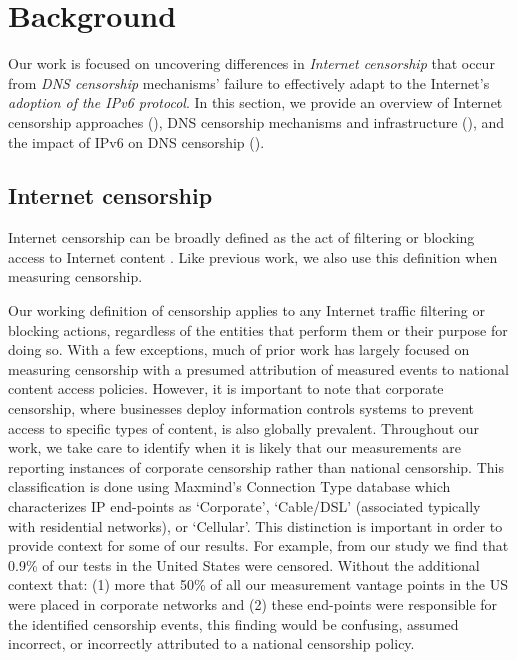 \section{Background}\label{sec:v4vsv6-background}
Our work is focused on uncovering differences in {\em Internet censorship} that occur
from {\em DNS censorship} mechanisms' failure to effectively adapt to the Internet's
{\em adoption of the IPv6 protocol}. In this section, we provide an overview of
Internet censorship approaches (), DNS
censorship mechanisms and infrastructure (), and the
impact of IPv6 on DNS censorship ().

\subsection{Internet censorship}\label{sec:v4vsv6-background:censorship}

Internet censorship can be broadly defined as the act of filtering or blocking
access to Internet content \cite{townsend}. Like previous work, we also use
this definition when measuring censorship.

Our working definition of censorship applies to any Internet traffic filtering
or blocking actions, regardless of the entities that perform them or their purpose for doing so. With a few
exceptions, much of prior work has largely focused on measuring censorship with
a presumed attribution of measured events to national content access policies.
However, it is important to note that corporate censorship, where businesses
deploy information controls systems to prevent access to specific types of
content, is also globally prevalent. 
%
Throughout our work, we take care to identify when it is likely that our
measurements are reporting instances of corporate censorship rather than
national censorship.  This classification is done using Maxmind's Connection
Type database \cite{maxmind-connectiondb} which characterizes IP end-points as
`Corporate', `Cable/DSL' (associated typically with residential networks), or
`Cellular'.
%
This distinction is important in order to provide context for some of our
results. For example, from our study we find that 0.9\% of our tests in the
United States were censored. Without the additional context that: (1) more that
50\% of all our measurement vantage points in the US were placed in corporate
networks and (2) these end-points were responsible for the identified
censorship events, this finding would be confusing, assumed incorrect, or
incorrectly attributed to a national censorship policy. 

